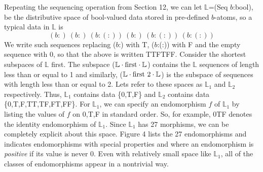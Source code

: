 \documentclass[11pt]{article}
\begin{document}
Repeating the sequencing operation from Section 12, we can let $\mathbb L$=(Seq $b$:bool), 
be the distributive space of bool-valued data stored in pre-defined $b$-atoms, so a typical data in $\mathbb L$ is 
\begin{equation}
(b:)\ (b:)\ (b:(:))\ (b:)\ (b:(:))\ (b:(:))
\end{equation}
We write such sequences replacing ($b$:) with T, ($b$:(:)) with F and the empty sequence with 0, so that the above is written TTFTFF.   
Consider the shortest subspaces of $\mathbb L$ first.  
The subspace (${\mathbb L}\cdot {\rm first}\cdot{\mathbb L}$) contains the $\mathbb L$ sequences of length less than or equal to 1 and similarly,  
(${\mathbb L}\cdot {\rm first\ 2}\cdot{\mathbb L}$) is the subspace of sequences with length less than or equal to 2.  Lets refer to these spaces as 
${\mathbb L}_1$ and ${\mathbb L}_2$ respectively.  
Thus, ${\mathbb L}_1$ contains data \{0,T,F\} and ${\mathbb L}_2$ contains data \{0,T,F,TT,TF,FT,FF\}. 
For ${\mathbb L}_1$, we can specify an endomorphism $f$ of ${\mathbb L}_1$ by listing the values of $f$ on 0,T,F in standard order.  So, for example, 
0TF denotes the identity endomorphism of ${\mathbb L}_1$.  
Since ${\mathbb L}_1$ has 27 morphisms, we can be completely explicit about this space.  
Figure 4 lists the 27 endomorphisms and indicates endomorphisms with special properties and where an endomorphism is {\it positive} if its value is never 0.  
Even with relatively small space like ${\mathbb L}_1$, all of 
the classes of endomorphisms appear in a nontrivial way.
\end{document}
